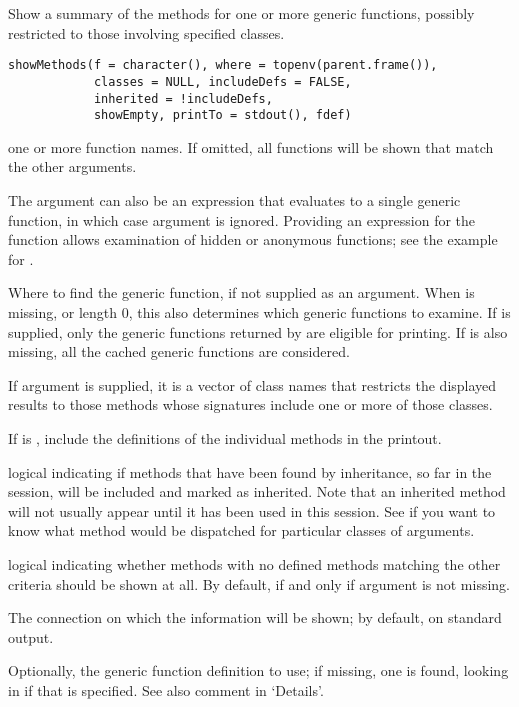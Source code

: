 %
\begin{Description}\relax
Show a summary of the methods for one or more generic functions,
possibly restricted to those involving specified classes.
\end{Description}
%
\begin{Usage}
\begin{verbatim}
showMethods(f = character(), where = topenv(parent.frame()),
            classes = NULL, includeDefs = FALSE,
            inherited = !includeDefs,
            showEmpty, printTo = stdout(), fdef)
\end{verbatim}
\end{Usage}
%
\begin{Arguments}
\begin{ldescription}
\item[\code{f}] one or more function names.  If omitted, all functions
will be shown that match the other arguments.

The argument can also be an expression that evaluates to a single
generic function, in which
case argument  is ignored.  Providing an expression for
the function allows examination of hidden or anonymous functions;
see the example for .
\item[\code{where}] Where to find the generic function, if not supplied as an
argument. When  is missing, or length 0, this also
determines which generic functions to examine.  If  is
supplied, only the generic functions returned by
 are eligible for printing.  If
 is also missing, all the cached generic functions are
considered.
\item[\code{classes}] If argument  is supplied, it is a vector
of class names that restricts the displayed results to those methods
whose signatures include one or more of those classes.
\item[\code{includeDefs}] If  is , include the
definitions of the individual methods in the printout.
\item[\code{inherited}] logical indicating if methods that have been found by
inheritance, so far in the session, will be included and marked as
inherited.  Note that an inherited method will not usually appear
until it has been used in this session.  See
 if you want to know what method would be
dispatched for particular classes of arguments.
\item[\code{showEmpty}] logical indicating whether methods with no defined
methods matching the other criteria should be shown at all.  By
default,  if and only if argument  is not
missing.
\item[\code{printTo}] The connection on which the information will be
shown; by default, on standard output.
\item[\code{fdef}] Optionally, the generic function definition to use; if
missing, one is found, looking in  if that is specified.
See also comment in `Details'.
\end{ldescription}
\end{Arguments}
